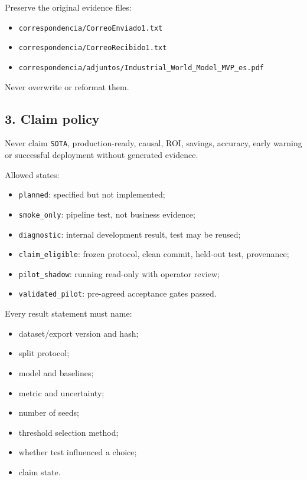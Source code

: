 \documentclass[
  spanish,
  10pt,
  a4paper,
]{article}
\providecommand{\tightlist}{%
  \setlength{\itemsep}{0pt}\setlength{\parskip}{0pt}}
\begin{document}
Preserve the original evidence files:

\begin{itemize}
\tightlist
\item
  \texttt{correspondencia/CorreoEnviado1.txt}
\item
  \texttt{correspondencia/CorreoRecibido1.txt}
\item
  \texttt{correspondencia/adjuntos/Industrial\_World\_Model\_MVP\_es.pdf}
\end{itemize}

Never overwrite or reformat them.

\subsection{3. Claim policy}\label{3-claim-policy}

Never claim \texttt{SOTA}, production-ready, causal, ROI, savings,
accuracy, early warning or successful deployment without generated
evidence.

Allowed states:

\begin{itemize}
\tightlist
\item
  \texttt{planned}: specified but not implemented;
\item
  \texttt{smoke\_only}: pipeline test, not business evidence;
\item
  \texttt{diagnostic}: internal development result, test may be reused;
\item
  \texttt{claim\_eligible}: frozen protocol, clean commit, held-out
  test, provenance;
\item
  \texttt{pilot\_shadow}: running read-only with operator review;
\item
  \texttt{validated\_pilot}: pre-agreed acceptance gates passed.
\end{itemize}

Every result statement must name:

\begin{itemize}
\tightlist
\item
  dataset/export version and hash;
\item
  split protocol;
\item
  model and baselines;
\item
  metric and uncertainty;
\item
  number of seeds;
\item
  threshold selection method;
\item
  whether test influenced a choice;
\item
  claim state.
\end{itemize}
\end{document}
